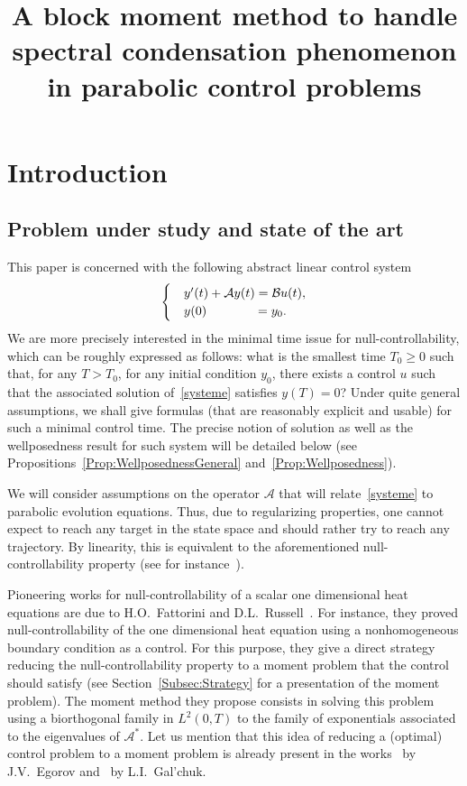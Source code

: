 \documentclass[AHL,Unicode,longabstracts]{cedram}
\title[A block moment method for parabolic control problems]{A block moment method to handle spectral condensation phenomenon in parabolic control problems}
\author{\firstname{Assia} \lastname{Benabdallah}}
\author{\firstname{Franck} \lastname{Boyer}}
\author{\firstname{Morgan} \lastname{Morancey}}
\newcommand\A{\mathcal{A}}
\newcommand\As{\mathcal{A}^*}
\newcommand\B{\mathcal{B}}
\begin{document}
\maketitle



\section{Introduction}

\subsection{Problem under study and state of the art}


This paper is concerned with the following abstract linear control system
\begin{equation}\label{systeme}
\begin{cases}
&y'(t) + \A y(t) = \B u(t),
\\
&y(0) \mkern68mu= y_0.
\end{cases}
\end{equation}
We are more precisely interested in the minimal time issue for null-controllability, which can be roughly expressed as follows: what is the smallest time $T_0 \geq0$ such that, for any $T > T_0$, for any initial condition $y_0$, there exists a control $u$ such that the associated solution of~\eqref{systeme} satisfies $y(T)=0$? Under quite general assumptions, we shall give formulas (that are reasonably explicit and usable) for such a minimal control time. The precise notion of solution as well as the wellposedness result for such system will be detailed below (see Propositions~\ref{Prop:WellposednessGeneral} and~\ref{Prop:Wellposedness}).

We will consider assumptions on the operator $\A$ that will relate~\eqref{systeme} to parabolic evolution equations. Thus, due to regularizing properties, one cannot expect to reach any target in the state space and should rather try to reach any trajectory. By linearity, this is equivalent to the aforementioned null-controllability property (see for instance~\cite[Sections.~2.3 and~2.5]{CoronBook}).

Pioneering works for null-controllability of a scalar one dimensional heat equations are due to H.O.~Fattorini and D.L.~Russell~\cite{FattoriniRussell71, FattoriniRussell74}. For instance, they proved null-controllability of the one dimensional heat equation using a nonhomogeneous boundary condition as a control. For this purpose, they give a direct strategy reducing the null-controllability property to a moment problem that the control should satisfy (see Section~\ref{Subsec:Strategy} for a presentation of the moment problem). The moment method they propose consists in solving this problem using a biorthogonal family in $L^2(0,T)$ to the family of exponentials associated to the eigenvalues of $\As$. Let us mention that this idea of reducing a (optimal) control problem to a moment problem is already present in the works~\cite{Egorov63} by J.V.~Egorov and~\cite{Galchuk69} by L.I.~Gal'chuk.
\end{document}
